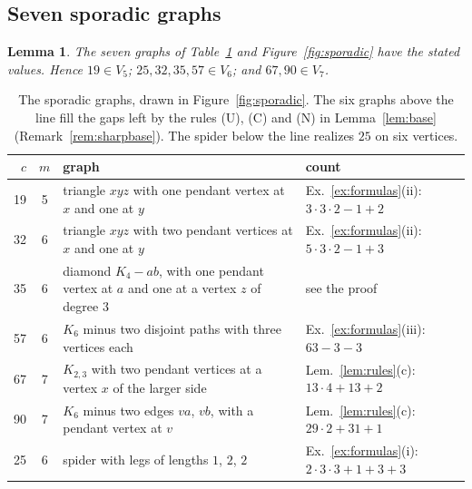 \documentclass[11pt]{amsart}
\newtheorem{lemma}[theorem]{Lemma}
\theoremstyle{definition}
\theoremstyle{remark}
\begin{document}
\subsection{Seven sporadic graphs}

\begin{lemma}\label{lem:sporadic}
The seven graphs of Table~\ref{tab:sporadic} and Figure~\ref{fig:sporadic} have the stated values. Hence $19\in V_5$; $25,32,35,57\in V_6$; and $67,90\in V_7$.
\end{lemma}

\begin{table}[ht]
\centering
\small
\begin{tabular}{r c p{7.3cm} p{4.6cm}}
\toprule
$c$ & $m$ & graph & count\\
\midrule
19 & 5 & triangle $xyz$ with one pendant vertex at $x$ and one at $y$ & Ex.~\ref{ex:formulas}(ii): $3\cdot3\cdot2-1+2$\\
32 & 6 & triangle $xyz$ with two pendant vertices at $x$ and one at $y$ & Ex.~\ref{ex:formulas}(ii): $5\cdot3\cdot2-1+3$\\
35 & 6 & diamond $K_4-ab$, with one pendant vertex at $a$ and one at a vertex $z$ of degree $3$ & see the proof\\
57 & 6 & $K_6$ minus two disjoint paths with three vertices each & Ex.~\ref{ex:formulas}(iii): $63-3-3$\\
67 & 7 & $K_{2,3}$ with two pendant vertices at a vertex $x$ of the larger side & Lem.~\ref{lem:rules}(c): $13\cdot4+13+2$\\
90 & 7 & $K_6$ minus two edges $va$, $vb$, with a pendant vertex at $v$ & Lem.~\ref{lem:rules}(c): $29\cdot2+31+1$\\
\midrule
25 & 6 & spider with legs of lengths $1$, $2$, $2$ & Ex.~\ref{ex:formulas}(i): $2\cdot3\cdot3+1+3+3$\\
\bottomrule
\end{tabular}
\caption{The sporadic graphs, drawn in Figure~\ref{fig:sporadic}. The six graphs above the line fill the gaps left by the rules (U), (C) and (N) in Lemma~\ref{lem:base} (Remark~\ref{rem:sharpbase}). The spider below the line realizes $25$ on six vertices.}
\label{tab:sporadic}
\end{table}
\end{document}
